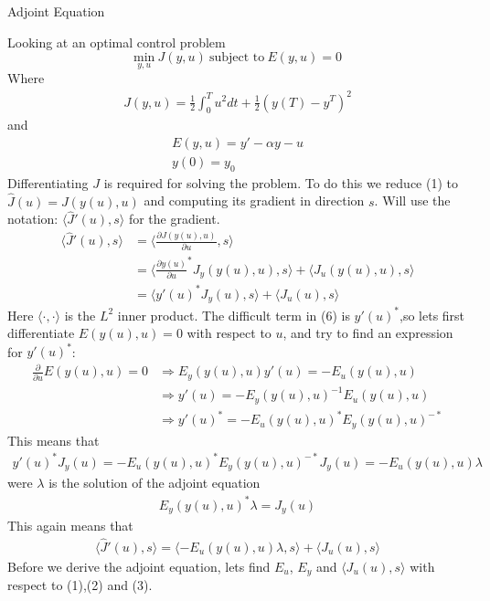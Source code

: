 \documentclass[11pt,a4paper]{report}
\begin{document}
\begin{center}

\LARGE Adjoint Equation


\end{center}
Looking at an optimal control problem $$\underset{y,u}{\text{min}} \ J(y,u) \ \text{subject to} \ E(y,u)=0$$ Where 
\begin{gather}
J(y,u) = \frac{1}{2}\int_0^Tu^2dt + \frac{1}{2}(y(T)-y^T)^2
\end{gather} 
and 
\begin{gather}
    E(y,u) = y'-\alpha y -u \\ 
    y(0)=y_0
\end{gather}
Differentiating $J$ is required for solving the problem. To do this we reduce (1) to $\hat{J}(u) = J(y(u),u) $ and computing its gradient in direction $s$. Will use the notation: $\langle\hat{J}'(u),s\rangle$ for the gradient.
\begin{align}    
\langle\hat{J}'(u),s\rangle &= \langle\frac{\partial J(y(u),u)}{\partial u},s\rangle \\ &= \langle \frac{\partial y(u)}{\partial u}^*J_y(y(u),u),s\rangle + \langle J_u(y(u),u),s\rangle \\ &= \langle y'(u)^*J_y(u),s\rangle +\langle J_u(u),s\rangle
\end{align}
Here $\langle\cdot,\cdot\rangle$ is the $L^2$ inner product. The difficult term in (6) is $y'(u)^*$,so lets first differentiate $E(y(u),u)=0$ with respect to $u$, and try to find an expression for $y'(u)^*$: 
\begin{align}
\frac{\partial}{\partial u}E(y(u),u)=0 &\Rightarrow E_y(y(u),u)y'(u)=-E_u(y(u),u) \\ &\Rightarrow y'(u)=-E_y(y(u),u)^{-1}E_u(y(u),u) \\ &\Rightarrow y'(u)^* = -E_u(y(u),u)^*E_y(y(u),u)^{-*}
\end{align} 
This means that 
\begin{gather}
y'(u)^*J_y(u)=-E_u(y(u),u)^*E_y(y(u),u)^{-*}J_y(u)=-E_u(y(u),u)\lambda
\end{gather}
were $\lambda$ is the solution of the adjoint equation 
\begin{gather}
E_y(y(u),u)^{*}\lambda=J_y(u)
\end{gather}
This again means that 
\begin{gather}
\langle\hat{J}'(u),s\rangle=\langle -E_u(y(u),u)\lambda,s\rangle +\langle J_u(u),s\rangle
\end{gather} 
Before we derive the adjoint equation, lets find $E_u$, $E_y$ and $ \langle J_u(u),s\rangle$ with respect to (1),(2) and (3).
\end{document}
